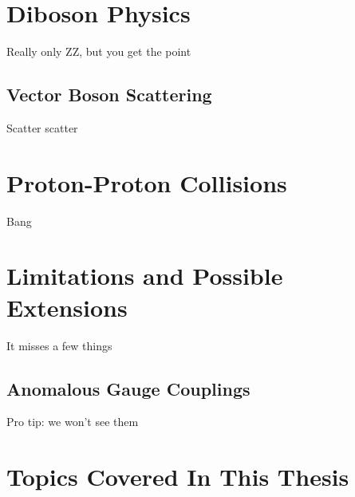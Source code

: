 \section{Diboson Physics}
Really only ZZ, but you get the point

\subsection{Vector Boson Scattering}
Scatter scatter



\section{Proton-Proton Collisions}\label{sec:pp}
Bang



\section{Limitations and Possible Extensions}
It misses a few things

\subsection{Anomalous Gauge Couplings}
Pro tip: we won't see them



\section{Topics Covered In This Thesis}
